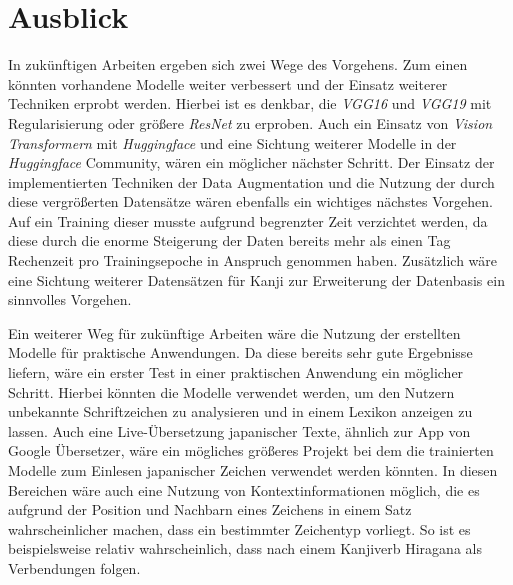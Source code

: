 \documentclass[twoside,a4paper]{IEEEtran}
\begin{document}
\section{Ausblick}
In zukünftigen Arbeiten ergeben sich zwei Wege des Vorgehens. Zum einen könnten vorhandene Modelle weiter verbessert und der Einsatz weiterer Techniken erprobt werden. Hierbei ist es denkbar, die \emph{VGG16} und \emph{VGG19} mit Regularisierung oder größere \emph{ResNet} zu erproben. Auch ein Einsatz von \emph{Vision Transformern} mit \emph{Huggingface} und eine Sichtung weiterer Modelle in der \emph{Huggingface} Community, wären ein möglicher nächster Schritt. Der Einsatz der implementierten Techniken der Data Augmentation und die Nutzung der durch diese vergrößerten Datensätze wären ebenfalls ein wichtiges nächstes Vorgehen. Auf ein Training dieser musste aufgrund begrenzter Zeit verzichtet werden, da diese durch die enorme Steigerung der Daten bereits mehr als einen Tag Rechenzeit pro Trainingsepoche in Anspruch genommen haben. Zusätzlich wäre eine Sichtung weiterer Datensätzen für Kanji zur Erweiterung der Datenbasis ein sinnvolles Vorgehen.

Ein weiterer Weg für zukünftige Arbeiten wäre die Nutzung der erstellten Modelle für praktische Anwendungen. Da diese bereits sehr gute Ergebnisse liefern, wäre ein erster Test in einer praktischen Anwendung ein möglicher Schritt. Hierbei könnten die Modelle verwendet werden, um den Nutzern unbekannte Schriftzeichen zu analysieren und in einem Lexikon anzeigen zu lassen. Auch eine Live-Übersetzung japanischer Texte, ähnlich zur App von Google Übersetzer, wäre ein mögliches größeres Projekt bei dem die trainierten Modelle zum Einlesen japanischer Zeichen verwendet werden könnten. In diesen Bereichen wäre auch eine Nutzung von Kontextinformationen möglich, die es aufgrund der Position und Nachbarn eines Zeichens in einem Satz wahrscheinlicher machen, dass ein bestimmter Zeichentyp vorliegt. So ist es beispielsweise relativ wahrscheinlich, dass nach einem Kanjiverb Hiragana als Verbendungen folgen.



%
%
\end{document}
